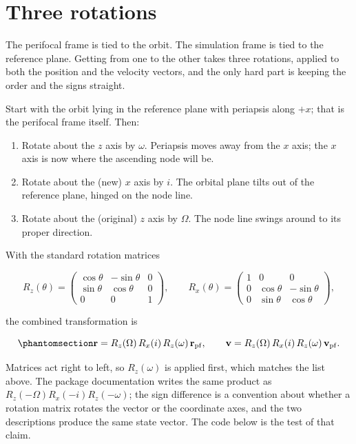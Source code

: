 \documentclass[
  10.5pt,
  letterpaper,
]{scrbook}
\providecommand{\tightlist}{%
  \setlength{\itemsep}{0pt}\setlength{\parskip}{0pt}}
\theoremstyle{plain}
\theoremstyle{remark}
\begin{document}
\section{Three rotations}\label{three-rotations}

The perifocal frame is tied to the orbit. The simulation frame is tied
to the reference plane. Getting from one to the other takes three
rotations, applied to both the position and the velocity vectors, and
the only hard part is keeping the order and the signs straight.

Start with the orbit lying in the reference plane with periapsis along
\(+x\); that is the perifocal frame itself. Then:

\begin{enumerate}
\def\labelenumi{\arabic{enumi}.}
\tightlist
\item
  Rotate about the \(z\) axis by \(\omega\). Periapsis moves away from
  the \(x\) axis; the \(x\) axis is now where the ascending node will
  be.
\item
  Rotate about the (new) \(x\) axis by \(i\). The orbital plane tilts
  out of the reference plane, hinged on the node line.
\item
  Rotate about the (original) \(z\) axis by \(\Omega\). The node line
  swings around to its proper direction.
\end{enumerate}

With the standard rotation matrices

\[
R_z(\theta) = \begin{pmatrix} \cos\theta & -\sin\theta & 0 \\ \sin\theta & \cos\theta & 0 \\ 0 & 0 & 1 \end{pmatrix}, \qquad
R_x(\theta) = \begin{pmatrix} 1 & 0 & 0 \\ 0 & \cos\theta & -\sin\theta \\ 0 & \sin\theta & \cos\theta \end{pmatrix},
\]

the combined transformation is

\begin{equation}\protect\phantomsection\label{eq-rotations}{
\mathbf{r} = R_z(\Omega)\,R_x(i)\,R_z(\omega)\,\mathbf{r}_{\mathrm{pf}}, \qquad
\mathbf{v} = R_z(\Omega)\,R_x(i)\,R_z(\omega)\,\mathbf{v}_{\mathrm{pf}}.
}\end{equation}

Matrices act right to left, so \(R_z(\omega)\) is applied first, which
matches the list above. The package documentation writes the same
product as \(R_z(-\Omega)R_x(-i)R_z(-\omega)\); the sign difference is a
convention about whether a rotation matrix rotates the vector or the
coordinate axes, and the two descriptions produce the same state vector.
The code below is the test of that claim.
\end{document}
